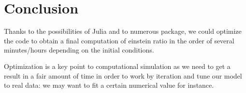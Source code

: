 \section{Conclusion}

Thanks to the possibilities of Julia and to numerous package, we could optimize the code to obtain a final computation of einstein ratio in the order of several minutes/hours depending on the initial conditions.

Optimization is a key point to computational simulation as we need to get a result in a fair amount of time in order to work by iteration and tune our model to real data: we may want to fit a certain numerical value for instance.